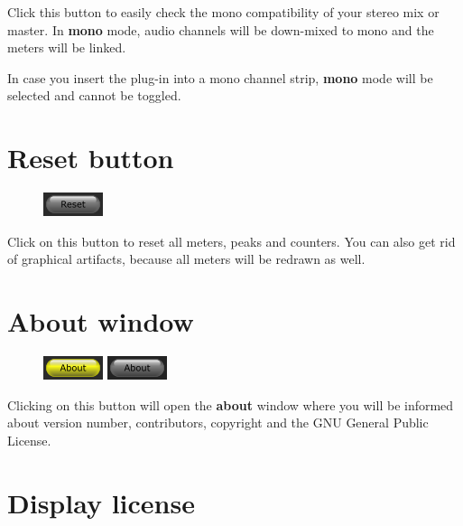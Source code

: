 Click this button to easily check the mono compatibility of your
stereo mix or master.  In \textbf{mono} mode, audio channels will be
down-mixed to mono and the meters will be linked.

In case you insert the plug-in into a mono channel strip,
\textbf{mono} mode will be selected and cannot be toggled.

\section{Reset button}

\begin{figure}
  \includegraphics[scale=\screenshotscale,clip]{include/images/button_reset.png}
\end{figure}

Click on this button to reset all meters, peaks and counters.  You can
also get rid of graphical artifacts, because all meters will be
redrawn as well.

\section{About window}

\begin{figure}
  \includegraphics[scale=\screenshotscale,clip]{include/images/button_about_on.png}
  \newline \vspace{-0.9\baselineskip}
  \includegraphics[scale=\screenshotscale,clip]{include/images/button_about_off.png}
\end{figure}

Clicking on this button will open the \textbf{about} window where you
will be informed about version number, contributors, copyright and the
GNU General Public License.

\section{Display license}

